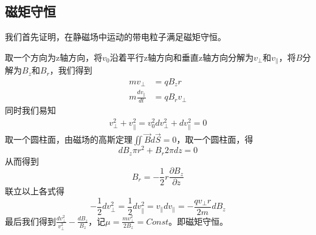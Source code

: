 \documentclass{ctexart}
\begin{document}
\subsection{磁矩守恒}
我们首先证明，在静磁场中运动的带电粒子满足磁矩守恒。
\par 
取一个方向为z轴方向，将$v_0$沿着平行z轴方向和垂直z轴方向分解为$v_{\perp }$和$v_{\parallel }$，将$B$分解为$B_z$和$B_r$，我们得到
\begin{align}
    mv_{\perp }&=qB_zr\\
    m\frac{dv_{\parallel }}{dt}&=qB_rv_{\perp }
\end{align}
同时我们易知
\begin{align}
    v_{\perp }^2+v_{\parallel }^2=v_0^2
    dv_{\perp }^2+dv_{\parallel }^2=0
\end{align}
取一个圆柱面，由磁场的高斯定理$\iint \vec{B}d\vec{S}=0$，取一个圆柱面，得
\begin{equation}
    dB_z\pi r^2+B_r2\pi dz=0
\end{equation}
从而得到
\begin{equation}
    B_r=-\frac{1}{2}r\frac{\partial B_z}{\partial z}
\end{equation}
联立以上各式得
\begin{equation}
    -\frac{1}{2}dv_{\perp }^2=\frac{1}{2}dv_{\parallel }^2=v_{\parallel }dv_{\parallel }=-\frac{qv_{\perp }r}{2m}dB_z
\end{equation}
最后我们得到$\frac{dv_{\perp }^2}{v_{\perp }^2}-\frac{dB_z}{B_z}$，记$\mu=\frac{mv_{\perp }^2}{2B_z}=Const$。即磁矩守恒。
\end{document}
